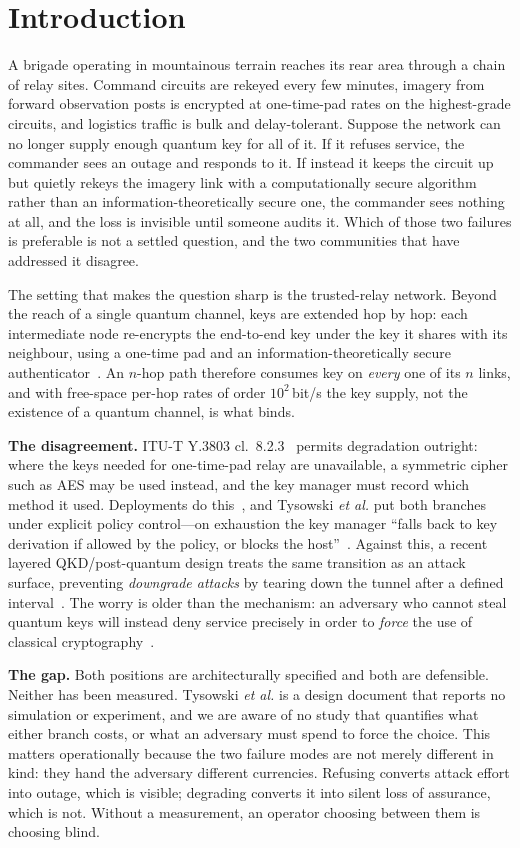 \documentclass[conference]{IEEEtran}
\begin{document}
\section{Introduction}
A brigade operating in mountainous terrain reaches its rear area through a chain
of relay sites. Command circuits are rekeyed every few minutes, imagery from
forward observation posts is encrypted at one-time-pad rates on the highest-grade
circuits, and logistics traffic is bulk and delay-tolerant. Suppose the network
can no longer supply enough quantum key for all of it. If it refuses service, the
commander sees an outage and responds to it. If instead it keeps the circuit up
but quietly rekeys the imagery link with a computationally secure algorithm
rather than an information-theoretically secure one, the commander sees nothing
at all, and the loss is invisible until someone audits it. Which of those two
failures is preferable is not a settled question, and the two communities that
have addressed it disagree.

The setting that makes the question sharp is the trusted-relay network. Beyond
the reach of a single quantum channel, keys are extended hop by hop: each
intermediate node re-encrypts the end-to-end key under the key it shares with its
neighbour, using a one-time pad and an information-theoretically secure
authenticator~\cite{salvail}. An $n$-hop path therefore consumes key on
\emph{every} one of its $n$ links, and with free-space per-hop rates of order
$10^2$\,bit/s the key supply, not the existence of a quantum channel, is what
binds.

\textbf{The disagreement.} ITU-T Y.3803 cl.~8.2.3~\cite{itu3803} permits
degradation outright: where the keys needed for one-time-pad relay are
unavailable, a symmetric cipher such as AES may be used instead, and the key
manager must record which method it used. Deployments do this~\cite{makris}, and
Tysowski \emph{et al.} put both branches under explicit policy control---on
exhaustion the key manager ``falls back to key derivation if allowed by the
policy, or blocks the host''~\cite{tysowski}. Against this, a recent layered
QKD/post-quantum design treats the same transition as an attack surface,
preventing \emph{downgrade attacks} by tearing down the tunnel after a defined
interval~\cite{spooren}. The worry is older than the mechanism: an adversary who
cannot steal quantum keys will instead deny service precisely in order to
\emph{force} the use of classical cryptography~\cite{schartner}.

\textbf{The gap.} Both positions are architecturally specified and both are
defensible. Neither has been measured. Tysowski \emph{et al.} is a design
document that reports no simulation or experiment, and we are aware of no study
that quantifies what either branch costs, or what an adversary must spend to
force the choice. This matters operationally because the two failure modes are
not merely different in kind: they hand the adversary different currencies.
Refusing converts attack effort into outage, which is visible; degrading converts
it into silent loss of assurance, which is not. Without a measurement, an
operator choosing between them is choosing blind.
\end{document}
